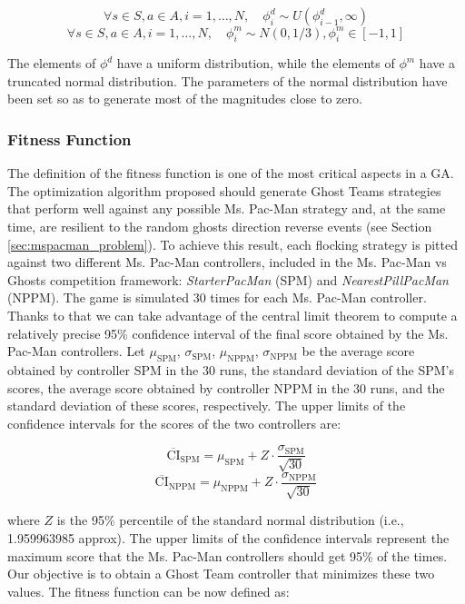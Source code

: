 \documentclass{llncs}
\begin{document}
\begin{equation}
	\label{eq:init_dist}
	\forall s \in S, a \in A,  i = 1, \ldots, N, \quad \phi^d_i \sim U(\phi^d_{i-1},\infty)
\end{equation}
\begin{equation}
	\label{eq:init_magn}
	\forall s \in S, a \in A,  i = 1, \ldots, N, \quad \phi^m_i \sim N(0,1/3), \phi^m_i \in [-1,1]
\end{equation}

The elements of $\phi^d$ have a uniform distribution, while the elements of $\phi^m$ have a truncated normal distribution. The parameters of the normal distribution have been set so as to generate most of the magnitudes close to zero.

\subsubsection{Fitness Function}
\label{subsubsec:GA_Fitness}

The definition of the fitness function is one of the most critical aspects in a GA. The optimization algorithm proposed should generate Ghost Teams strategies that perform well against any possible Ms. Pac-Man strategy and, at the same time, are resilient to the random ghosts direction reverse events (see Section \ref{sec:mspacman_problem}). To achieve this result, each flocking strategy is pitted against two different Ms. Pac-Man controllers, included in the Ms. Pac-Man vs Ghosts competition framework: \textit{StarterPacMan} (SPM) and \textit{NearestPillPacMan} (NPPM). The game is simulated 30 times for each Ms. Pac-Man controller. Thanks to that we can take advantage of the central limit theorem to compute a relatively precise 95\% confidence interval of the final score obtained by the Ms. Pac-Man controllers. Let $\mu_\mathrm{SPM}$, $\sigma_\mathrm{SPM}$, $\mu_\mathrm{NPPM}$, $\sigma_\mathrm{NPPM}$ be the average score obtained by controller SPM in the 30 runs, the standard deviation of the SPM's scores, the average score obtained by controller NPPM in the 30 runs, and the standard deviation of these scores, respectively. The upper limits of the confidence intervals for the scores of the two controllers are:

$$\overline{\mathrm{CI}}_\mathrm{SPM} = \mu_\mathrm{SPM} + Z \cdot \frac{\sigma_\mathrm{SPM}}{\sqrt{30}}$$
$$\overline{\mathrm{CI}}_\mathrm{NPPM} = \mu_\mathrm{NPPM} + Z \cdot \frac{\sigma_\mathrm{NPPM}}{\sqrt{30}}$$

where $Z$ is the 95\% percentile of the standard normal distribution (i.e., 1.959963985 approx). The upper limits of the confidence intervals represent the maximum score that the Ms. Pac-Man controllers should get 95\% of the times. Our objective is to obtain a Ghost Team controller that minimizes these two values. The fitness function can be now defined as:
\end{document}

